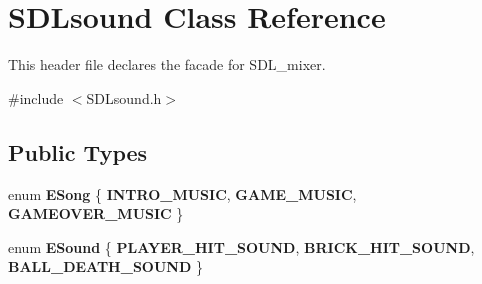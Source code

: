 \hypertarget{class_s_d_lsound}{}\section{S\+D\+Lsound Class Reference}
\label{class_s_d_lsound}


This header file declares the facade for S\+D\+L\+\_\+mixer.  




{\ttfamily \#include $<$S\+D\+Lsound.\+h$>$}

\subsection*{Public Types}
\begin{DoxyCompactItemize}
\item 
\hypertarget{class_s_d_lsound_a27bf722536cbdd17222b44edbbec4e49}{}enum {\bfseries E\+Song} \{ {\bfseries I\+N\+T\+R\+O\+\_\+\+M\+U\+S\+I\+C}, 
{\bfseries G\+A\+M\+E\+\_\+\+M\+U\+S\+I\+C}, 
{\bfseries G\+A\+M\+E\+O\+V\+E\+R\+\_\+\+M\+U\+S\+I\+C}
 \}\label{class_s_d_lsound_a27bf722536cbdd17222b44edbbec4e49}

\item 
\hypertarget{class_s_d_lsound_ab679a879ea206f956c579f785a3973cc}{}enum {\bfseries E\+Sound} \{ {\bfseries P\+L\+A\+Y\+E\+R\+\_\+\+H\+I\+T\+\_\+\+S\+O\+U\+N\+D}, 
{\bfseries B\+R\+I\+C\+K\+\_\+\+H\+I\+T\+\_\+\+S\+O\+U\+N\+D}, 
{\bfseries B\+A\+L\+L\+\_\+\+D\+E\+A\+T\+H\+\_\+\+S\+O\+U\+N\+D}
 \}\label{class_s_d_lsound_ab679a879ea206f956c579f785a3973cc}

\end{DoxyCompactItemize}
